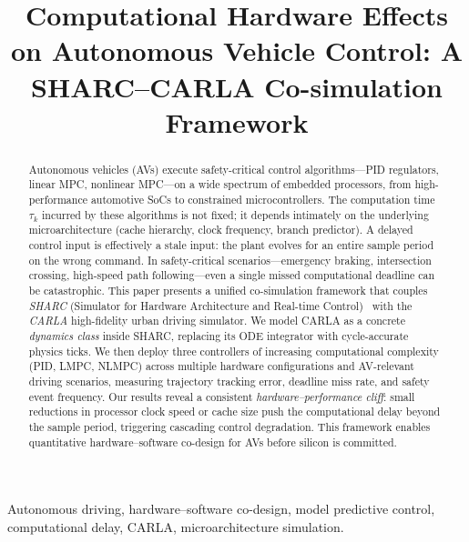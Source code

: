 \documentclass[conference]{IEEEtran}
\begin{document}
\title{Computational Hardware Effects on Autonomous Vehicle
  Control: A SHARC--CARLA Co-simulation Framework}

\author{
}

\maketitle

\begin{abstract}
Autonomous vehicles (AVs) execute safety-critical control algorithms—PID
regulators, linear MPC, nonlinear MPC—on a wide spectrum of embedded
processors, from high-performance automotive SoCs to constrained
microcontrollers.  The computation time $\tau_k$ incurred by these
algorithms is not fixed; it depends intimately on the underlying
microarchitecture (cache hierarchy, clock frequency, branch predictor).
A delayed control input is effectively a stale input: the plant evolves
for an entire sample period on the wrong command.  In safety-critical
scenarios—emergency braking, intersection crossing, high-speed path
following—even a single missed computational deadline can be catastrophic.
This paper presents a unified co-simulation framework that couples
\emph{SHARC} (Simulator for Hardware Architecture and Real-time
Control)~\cite{wintz2025sharc} with the \emph{CARLA} high-fidelity
urban driving simulator.  We model CARLA as a concrete \emph{dynamics
class} inside SHARC, replacing its ODE integrator with cycle-accurate
physics ticks.  We then deploy three controllers of increasing
computational complexity (PID, LMPC, NLMPC) across multiple hardware
configurations and AV-relevant driving scenarios, measuring trajectory
tracking error, deadline miss rate, and safety event frequency.  Our
results reveal a consistent \emph{hardware--performance cliff}: small
reductions in processor clock speed or cache size push the computational
delay beyond the sample period, triggering cascading control degradation.
This framework enables quantitative hardware--software co-design for AVs
before silicon is committed.
\end{abstract}

\begin{IEEEkeywords}
Autonomous driving, hardware--software co-design, model predictive
control, computational delay, CARLA, microarchitecture simulation.
\end{IEEEkeywords}
\end{document}
